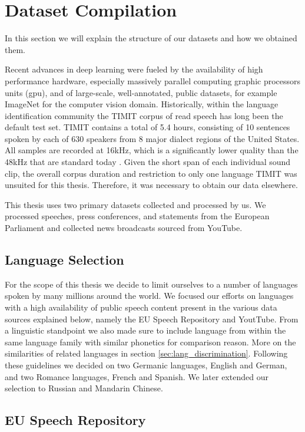 \section{Dataset Compilation}
\label{sec:datasets}
	In this section we will explain the structure of our datasets and how we obtained them.

	Recent advances in deep learning were fueled by the availability of high performance hardware, especially massively parallel computing graphic processors units (\ac{gpu}), and of large-scale, well-annotated, public datasets, for example ImageNet \cite{ILSVRC15} for the computer vision domain. Historically, within the language identification community the TIMIT corpus of read speech \cite{garofolo1993darpa} has long been the default test set. TIMIT contains a total of 5.4 hours, consisting of 10 sentences spoken by each of 630 speakers from 8 major dialect regions of the United States. All samples are recorded at 16kHz, which is a significantly lower quality than the 48kHz that are standard today . Given the short span of each individual sound clip, the overall corpus duration and restriction to only one language TIMIT was unsuited for this thesis. Therefore, it was necessary to obtain our data elsewhere. 
  
  	This thesis uses two primary datasets collected and processed by us. We processed speeches, press conferences, and statements from the European Parliament and collected news broadcasts sourced from YouTube.

\subsection{Language Selection}  
For the scope of this thesis we decide to limit ourselves to a number of  languages spoken by many millions around the world. We focused our efforts on languages with a high availability of public speech content present in the various data sources explained below, namely the EU Speech Repository and YoutTube. From a linguistic standpoint we also made sure to include language from within the same language family with  similar phonetics for comparison reason. More on the similarities of related languages in section \ref{sec:lang_discrimination}. Following these guidelines we decided on two Germanic languages, English and German, and two Romance languages, French and Spanish. We later extended our selection to Russian and Mandarin Chinese.

\subsection{EU Speech Repository}


